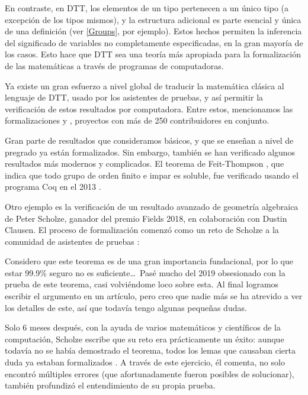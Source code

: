 \documentclass[../main.tex]{subfiles}
\begin{document}
En contraste, en DTT, los elementos de un tipo pertenecen a un \'unico tipo (a excepción de los tipos mismos), y la estructura adicional es parte esencial y \'unica de una definición (ver \ref{Groups}, por ejemplo).
Estos hechos permiten la inferencia del significado de variables no completamente especificadas, en la gran mayor\'ia de los casos.
Esto hace que DTT sea una teor\'ia m\'as apropiada para la formalizaci\'on de las matemáticas a trav\'es de programas de computadoras.

Ya existe un gran esfuerzo a nivel global de traducir la matemática cl\'asica al lenguaje de DTT, usado por los asistentes de pruebas, y as\'i permitir la verificaci\'on de estos resultados por computadora.
Entre estos, mencionamos las formalizaciones \cite{mahboubi_mathematical_2021} y \cite{the_mathlib_community_lean_2020}, proyectos con m\'as de 250 contribuidores en conjunto.

Gran parte de resultados que consideramos b\'asicos, y que se ense\~nan a nivel de pregrado ya est\'an formalizados.
Sin embargo, tambi\'en se han verificado algunos resultados m\'as modernos y complicados.
El teorema de Feit-Thompson \cite{1103053943}, que indica que todo grupo de orden finito e impar es soluble, fue verificado usando el programa Coq en el 2013 \cite{ftcoq2013}.

Otro ejemplo es la verificaci\'on de un resultado avanzado de geometr\'ia algebraica de Peter Scholze, ganador del premio Fields 2018, en colaboraci\'on con Dustin Clausen.
El proceso de formalizaci\'on comenz\'o como un reto de Scholze a la comunidad de asistentes de pruebas \cite{scholze_2020}:
\begin{displayquote}
    Considero que este teorema es de una gran importancia fundacional, por lo que estar 99.9\% seguro no es suficiente\ldots\
    Pas\'e mucho del 2019 obsesionado con la prueba de este teorema, casi volvi\'endome loco sobre esta. Al final logramos escribir el argumento en un art\'iculo, pero creo que nadie m\'as se ha atrevido a ver los detalles de este, as\'i que todav\'ia tengo algunas peque\~nas dudas.
\end{displayquote}

Solo 6 meses despu\'es, con la ayuda de varios matem\'aticos y cient\'ificos de la computaci\'on, Scholze escribe que su reto era pr\'acticamente un \'exito: aunque todav\'ia no se hab\'ia demostrado el teorema, todos los lemas que causaban cierta duda ya estaban formalizados \cite{scholze_half_2021}.
A trav\'es de este ejercicio, \'el comenta, no solo encontr\'o m\'ultiples errores (que afortunadamente fueron posibles de solucionar), tambi\'en profundiz\'o el entendimiento de su propia prueba.
\end{document}
